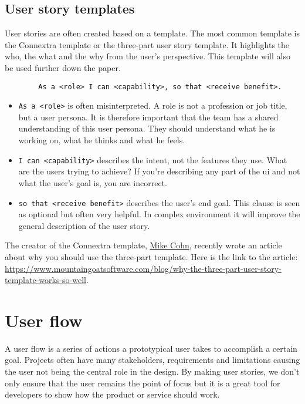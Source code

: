     \subsection{User story templates}
        User stories are often created based on a template. The most common template is the Connextra template or the three-part user story template. It highlights the who, the what and the why from the user's perspective. This template will also be used further down the paper.
        
    \begin{verbatim}
        As a <role> I can <capability>, so that <receive benefit>.
    \end{verbatim}
    
    \begin{itemize}
        \item{\texttt{As a <role>} is often misinterpreted. A role is not a profession or job title, but a user persona. It is therefore important that the team has a shared understanding of this user persona. They should understand what he is working on, what he thinks and what he feels.}
        \item{\texttt{I can <capability>} describes the intent, not the features they use. What are the users trying to achieve? If you're describing any part of the \gls{ui} and not what the user's goal is, you are incorrect.}
        \item{\texttt{so that <receive benefit>} describes the user's end goal. This clause is seen as optional but often very helpful. In complex environment it will improve the general description of the user story.}
    \end{itemize}  
         
    The creator of the Connextra template, \href{https://en.wikipedia.org/wiki/Mike_Cohn/}{Mike Cohn}, recently wrote an article about why you should use the three-part template. Here is the link to the article:  \url{https://www.mountaingoatsoftware.com/blog/why-the-three-part-user-story-template-works-so-well}.
    
   \section{User flow}
    A user flow is a series of actions a prototypical user takes to accomplish a certain goal. 
    Projects often have many stakeholders, requirements and limitations causing the user not being the central role in the design. By making user stories, we don't only ensure that the user remains the point of focus but it is a great tool for developers to show how the product or service should work.
    
